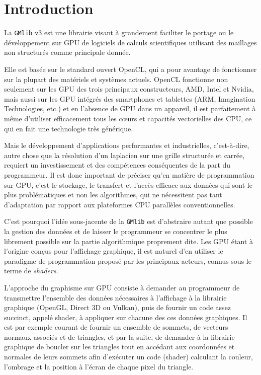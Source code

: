 \documentclass[a4paper,12pt]{article}
\begin{document}
\clearpage


%
%


\section{Introduction}
La {\tt GMlib} v3 est une librairie visant à grandement faciliter le portage ou le développement sur GPU de logiciels de calculs scientifiques utilisant des maillages non structurés comme principale donnée.

Elle est basée sur le standard ouvert OpenCL, qui a pour avantage de fonctionner sur la plupart des matériels et systèmes actuels.
OpenCL fonctionne non seulement sur les GPU des trois principaux constructeurs, AMD, Intel et Nvidia, mais aussi sur les GPU intégrés des smartphones et tablettes (ARM, Imagination Technologies, etc.) et en l'absence de GPU dans un appareil, il est parfaitement à même d'utiliser efficacement tous les c\oe{}urs et capacités vectorielles des CPU, ce qui en fait une technologie très générique.

Mais le développement d'applications performantes et industrielles, c'est-à-dire, autre chose que la résolution d'un laplacien sur une grille structurée et carrée, requiert un investissement et des compétences conséquentes de la part du programmeur.
Il est donc important de préciser qu'en matière de programmation sur GPU, c'est le stockage, le transfert et l'accès efficace aux données qui sont le plus problématiques et non les algorithmes, qui ne nécessitent pas tant d'adaptation par rapport aux plateformes CPU parallèles conventionnelles.

C'est pourquoi l'idée sous-jacente de la {\tt GMlib} est d'abstraire autant que possible la gestion des données et de laisser le programmeur se concentrer le plus librement possible sur la partie algorithmique proprement dite.
Les GPU étant à l'origine conçus pour l'affichage graphique, il est naturel d'en utiliser le paradigme de programmation proposé par les principaux acteurs, connus sous le terme de \emph{shaders}.

L'approche du graphisme sur GPU consiste à demander au programmeur de transmettre l'ensemble des données nécessaires à l'affichage à la librairie graphique (OpenGL, Direct 3D ou Vulkan), puis de fournir un code assez succinct, appelé shader, à appliquer sur chacune des ces données graphiques.
Il est par exemple courant de fournir un ensemble de sommets, de vecteurs normaux associés et de triangles, et par la suite, de demander à la librairie graphique de boucler sur les triangles tout en accédant aux coordonnées et normales de leurs sommets afin d'exécuter un code (shader) calculant la couleur, l'ombrage et la position à l'écran de chaque pixel du triangle.
\end{document}
